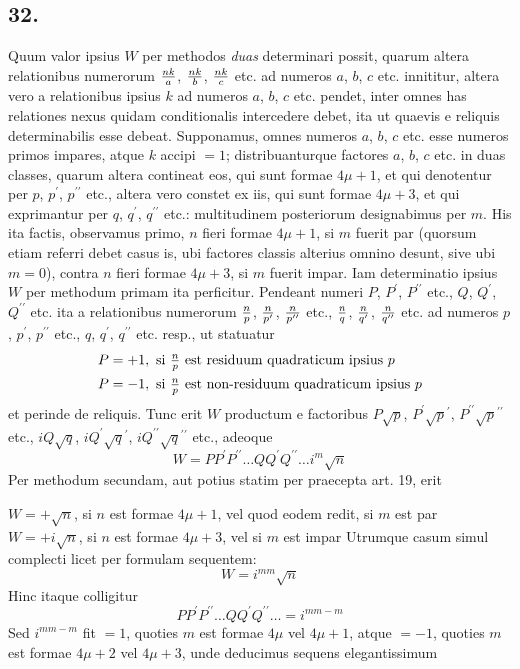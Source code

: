 \documentclass[twoside,12pt]{memoir}
\renewenvironment{quote}%
  {\list{}{\leftmargin=5em\rightmargin=0em}\item[]}%
  {\endlist}
\let\oldfrac\frac
\def\frac#1#2{\mathchoice{\tfrac{#1}{#2}}{\oldfrac{#1}{#2}}{\genfrac{}{}{}{2}{#1}{#2\mathstrut}}{\genfrac{}{}{}{3}{#1}{#2\mathstrut}}}
\begin{document}
\subsection*{32.}
 
Quum valor ipsius \(W\) per methodos \textit{duas} determinari possit, quarum altera relationibus numerorum \(\frac{n k}{a}\), \(\frac{n k}{b}\), \(\frac{n k}{c}\) etc. ad numeros \(a\), \(b\), \(c\) etc. innititur, altera vero a relationibus ipsius \(k\) ad numeros \(a\), \(b\), \(c\)  etc. pendet, inter omnes has relationes nexus quidam conditionalis intercedere debet, ita ut quaevis e reliquis determinabilis esse debeat. Supponamus, omnes numeros \(a\), \(b\), \(c\) etc. esse numeros primos impares, atque \(k\) accipi \(=1\); distribuanturque factores \(a\), \(b\), \(c\)  etc. in duas classes, quarum altera contineat eos, qui sunt formae \(4 \mu+1\), et qui denotentur per \(p\), \(p^{\prime}\), \(p^{\prime \prime}\) etc., altera vero constet ex iis, qui sunt formae \(4 \mu+3\), et qui exprimantur per \(q\), \(q^{\prime}\), \(q^{\prime \prime}\) etc.: multitudinem posteriorum designabimus per \(m\). His ita factis, observamus primo, \(n\) fieri formae \(4 \mu+1\), si \(m\) fuerit par (quorsum etiam referri debet casus is, ubi factores classis alterius omnino desunt, sive ubi \(m=0\)), contra \(n\) fieri formae \(4 \mu+3\), si \(m\) fuerit impar. Iam determinatio\pagebreak%
ipsius \(W\) per methodum primam ita perficitur. Pendeant numeri \(P\), \(P^{\prime}\), \(P^{\prime \prime}\) etc., \(Q\), \(Q^{\prime}\), \(Q^{\prime \prime}\) etc. ita a relationibus numerorum \(\frac{n}{p}\), \(\frac{n}{p^{\prime}}\), \(\frac{n}{p^{\prime \prime}}\) etc., \(\frac{n}{q}\), \(\frac{n}{q^{\prime}}\), \(\frac{n}{q^{\prime \prime}}\) etc. ad numeros \(p\), \(p^{\prime}\), \(p^{\prime \prime}\) etc., \(q\), \(q^{\prime}\), \(q^{\prime \prime}\) etc. resp., ut statuatur
\[\begin{aligned}
& P=+1, \text{ si } \frac{n}{p} \text{ est residuum quadraticum ipsius } p \\
& P=-1, \text{ si } \frac{n}{p} \text{ est non-residuum quadraticum ipsius } p
\end{aligned}\]
et perinde de reliquis. Tunc erit \(W\) productum e factoribus \(P \surd p\), \(P^{\prime} \surd p^{\prime}\), \(P^{\prime \prime} \surd p^{\prime \prime}\) etc., \(i Q \surd q\), \(i Q^{\prime} \surd q^{\prime}\), \(i Q^{\prime \prime} \surd q^{\prime \prime}\) etc., adeoque
\[W=P P^{\prime} P^{\prime \prime} \ldots Q Q^{\prime} Q^{\prime \prime} \ldots i^{m} \surd n\]
Per methodum secundam, aut potius statim per praecepta art. 19, erit
\begin{quote}\(W=+\surd n\), si \(n\) est formae \(4 \mu+1\), vel quod eodem redit, si \(m\) est par\\
\(W=+i \sqrt n\), si \(n\) est formae \(4 \mu+3\), vel si \(m\) est impar\end{quote}
Utrumque casum simul complecti licet per formulam sequentem:
\[W=i^{m m} \surd n\]
Hinc itaque colligitur
\[P P^{\prime} P^{\prime \prime} \ldots Q Q^{\prime} Q^{\prime \prime} \ldots=i^{m m-m}\]
Sed \(i^{m m-m}\) fit \(=1\), quoties \(m\) est formae \(4 \mu\) vel \(4 \mu+1\), atque \(=-1\), quoties \(m\) est formae \(4 \mu+2\) vel \(4 \mu+3\), unde deducimus sequens elegantissimum
\end{document}
